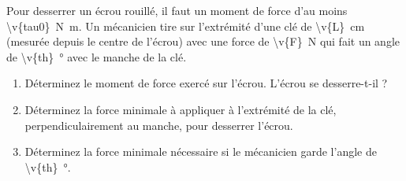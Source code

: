 Pour desserrer un écrou rouillé, il faut un moment de force d'au moins \qty{\v{tau0}}{N.m}. Un mécanicien tire sur l'extrémité d'une clé de \qty{\v{L}}{cm} (mesurée depuis le centre de l'écrou) avec une force de \qty{\v{F}}{N} qui fait un angle de \qty{\v{th}}{\degree} avec le manche de la clé.

\begin{enumerate}[label=\alph*)]
    \item Déterminez le moment de force exercé sur l'écrou. L'écrou se desserre-t-il ?
    \item Déterminez la force minimale à appliquer à l'extrémité de la clé, perpendiculairement au manche, pour desserrer l'écrou.
    \item Déterminez la force minimale nécessaire si le mécanicien garde l'angle de \qty{\v{th}}{\degree}.
\end{enumerate}
